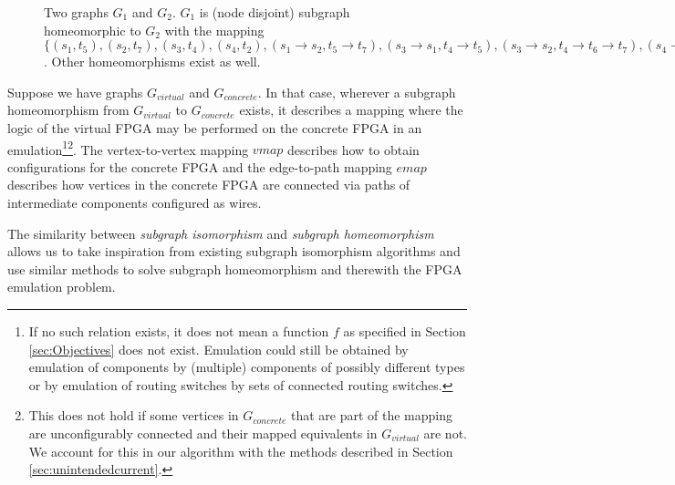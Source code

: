\begin{figure}
\centering
\parbox{1.2in}{

}
\qquad\qquad
\begin{minipage}{1.2in}%

\end{minipage}
\caption{Two graphs $G_1$ and $G_2$. $G_1$ is (node disjoint) subgraph homeomorphic to $G_2$ with the mapping $\{(s_1, t_5), (s_2, t_7), (s_3, t_4), (s_4, t_2), (s_1 \to s_2, t_5 \to t_7), (s_3 \to s_1, t_4 \to t_5), (s_3 \to s_2, t_4 \to t_6 \to t_7), (s_4 \to s_3, t_2 \to t_3 \to t_4)\}$. Other homeomorphisms exist as well.}
\end{figure}

Suppose we have graphs $G_{virtual}$ and $G_{concrete}$. In that case, wherever a subgraph homeomorphism from $G_{virtual}$ to $G_{concrete}$ exists, it describes a mapping where the logic of the virtual FPGA may be performed on the concrete FPGA in an emulation\footnote{If no such relation exists, it does not mean a function $f$ as specified in Section \ref{sec:Objectives} does not exist. Emulation could still be obtained by emulation of components by (multiple) components of possibly different types or by emulation of routing switches by sets of connected routing switches.}\footnote{This does not hold if some vertices in $G_{concrete}$ that are part of the mapping are unconfigurably connected and their mapped equivalents in $G_{virtual}$ are not. We account for this in our algorithm with the methods described in Section \ref{sec:unintendedcurrent}.}. The vertex-to-vertex mapping $\mathit{vmap}$ describes how to obtain configurations for the concrete FPGA and the edge-to-path mapping $\mathit{emap}$ describes how vertices in the concrete FPGA are connected via paths of intermediate components configured as wires.


The similarity between \textit{subgraph isomorphism} and \textit{subgraph homeomorphism} allows us to take inspiration from existing subgraph isomorphism algorithms and use similar methods to solve subgraph homeomorphism and therewith the FPGA emulation problem.


